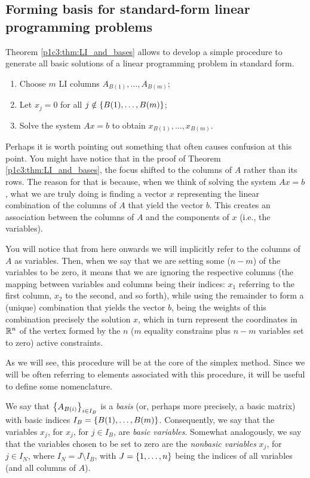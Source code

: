 \subsection{Forming basis for standard-form linear programming problems}

Theorem \ref{p1c3:thm:LI_and_bases} allows to develop a simple procedure to generate all basic solutions of a linear programming problem in standard form.

\begin{enumerate}
	\item Choose $m$ LI columns $A_{B(1)}, \dots, A_{B(m)}$;
	\item Let $x_j = 0$ for all $j \notin \left\{ B(1), \dots, B(m) \right \}$;
	\item Solve the system $Ax = b$ to obtain $x_{B(1)}, \dots, x_{B(m)}$.
\end{enumerate}

Perhaps it is worth pointing out something that often causes confusion at this point. You might have notice that in the proof of Theorem \ref{p1c3:thm:LI_and_bases}, the focus shifted to the columns of $A$ rather than its rows. The reason for that is because, when we think of solving the system $Ax = b$, what we are truly doing is finding a vector $x$ representing the linear combination of the columns of $A$ that yield the vector $b$. This creates an association between the columns of $A$ and the components of $x$ (i.e., the variables). 

You will notice that from here onwards we will implicitly refer to the columns of $A$ as variables. Then, when we say that we are setting some ($n-m$) of the variables to be zero, it means that we are ignoring the respective columns (the mapping between variables and columns being their indices: $x_1$ referring to the first column, $x_2$ to the second, and so forth), while using the remainder to form a (unique) combination that yields the vector $b$, being the weights of this combination precisely the solution $x$, which in turn represent the coordinates in $\mathbb{R}^n$ of the vertex formed by the $n$ ($m$ equality constrains plus $n-m$ variables set to zero) active constraints.   

As we will see, this procedure will be at the core of the simplex method. Since we will be often referring to elements associated with this procedure, it will be useful to define some nomenclature.

We say that $\left\{ A_{B(i)} \right \}_{i \in I_B}$ is a \emph{basis} (or, perhaps more precisely, a basic matrix) with basic indices $I_B = \left\{ B(1), \dots, B(m) \right \}$. Consequently, we say that the variables $x_j$, for $x_j$, for $j \in I_B$, are \emph{basic variables}. Somewhat analogously, we say that the variables chosen to be set to zero are the \emph{nonbasic variables} $x_j$, for $j \in I_N$, where $I_N = J \setminus I_B$, with $J = \left\{ 1, \dots, n \right \}$ being the indices of all variables (and all columns of $A$).


